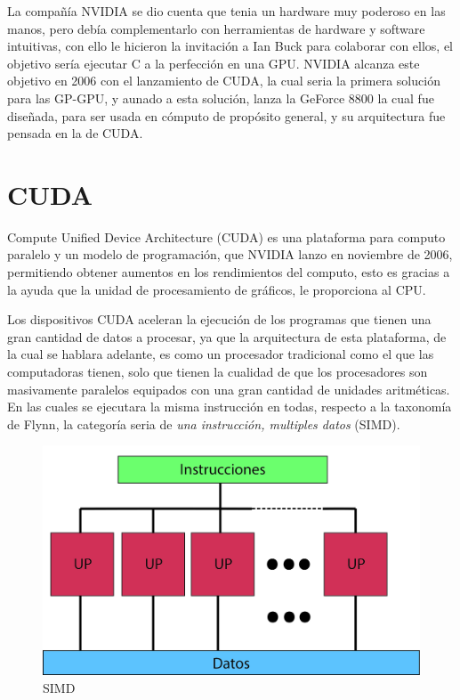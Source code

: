 La compañía NVIDIA se dio cuenta que tenia un hardware muy poderoso en las manos, pero debía complementarlo con herramientas de hardware y software intuitivas, con ello le hicieron la invitación a Ian Buck para colaborar con ellos, el objetivo sería ejecutar C a la perfección en una GPU. NVIDIA alcanza este objetivo en 2006 con el lanzamiento de CUDA, la cual seria la primera solución para las GP-GPU, y aunado a esta solución, lanza la GeForce 8800 la cual fue diseñada, para ser usada en cómputo de propósito general, y su arquitectura fue pensada en la de CUDA. 

\pagebreak
\section{CUDA}
Compute Unified Device Architecture (CUDA) es una plataforma para computo paralelo y un modelo de programación, que NVIDIA lanzo en noviembre de 2006, permitiendo obtener aumentos en los rendimientos del computo, esto es gracias a la ayuda que la unidad de procesamiento de gráficos, le proporciona al CPU. 

Los dispositivos CUDA aceleran la ejecución de los programas que tienen una gran cantidad de datos a procesar, ya que la arquitectura de esta plataforma, de la cual se hablara adelante, es como un procesador tradicional como el que las computadoras tienen, solo que tienen la cualidad de que los procesadores son masivamente paralelos equipados con una gran cantidad de unidades aritméticas. En las cuales se ejecutara la misma instrucción en todas, respecto a la taxonomía de Flynn, la categoría seria de \textit{una instrucción, multiples datos} (SIMD). 

\begin{figure}[h]
			\centering
				\includegraphics[scale=0.1]{img/SIMD.jpg}
			\caption{SIMD}
\end{figure}



